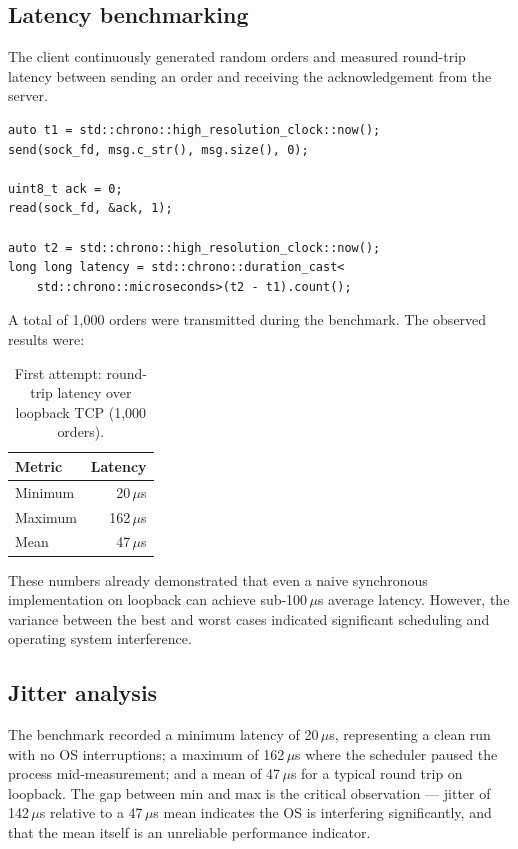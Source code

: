 \documentclass[11pt,a4paper]{article}
\begin{document}
\subsection{Latency benchmarking}

The client continuously generated random orders and measured round-trip
latency between sending an order and receiving the acknowledgement from the
server.

\begin{lstlisting}[caption={Latency measurement}]
auto t1 = std::chrono::high_resolution_clock::now();
send(sock_fd, msg.c_str(), msg.size(), 0);

uint8_t ack = 0;
read(sock_fd, &ack, 1);

auto t2 = std::chrono::high_resolution_clock::now();
long long latency = std::chrono::duration_cast<
    std::chrono::microseconds>(t2 - t1).count();
\end{lstlisting}

A total of 1{,}000 orders were transmitted during the benchmark. The
observed results were:

\begin{table}[h]
\centering
\begin{tabular}{lr}
\toprule
Metric & Latency \\
\midrule
Minimum & 20\,$\mu$s \\
Maximum & 162\,$\mu$s \\
Mean    & 47\,$\mu$s \\
\bottomrule
\end{tabular}
\caption{First attempt: round-trip latency over loopback TCP (1{,}000 orders).}
\end{table}

These numbers already demonstrated that even a naive synchronous
implementation on loopback can achieve sub-100\,$\mu$s average latency.
However, the variance between the best and worst cases indicated
significant scheduling and operating system interference.

\subsection{Jitter analysis}

The benchmark recorded a minimum latency of 20\,$\mu$s, representing a clean
run with no OS interruptions; a maximum of 162\,$\mu$s where the scheduler
paused the process mid-measurement; and a mean of 47\,$\mu$s for a typical
round trip on loopback. The gap between min and max is the critical
observation --- jitter of 142\,$\mu$s relative to a 47\,$\mu$s mean indicates
the OS is interfering significantly, and that the mean itself is an
unreliable performance indicator.
\end{document}
